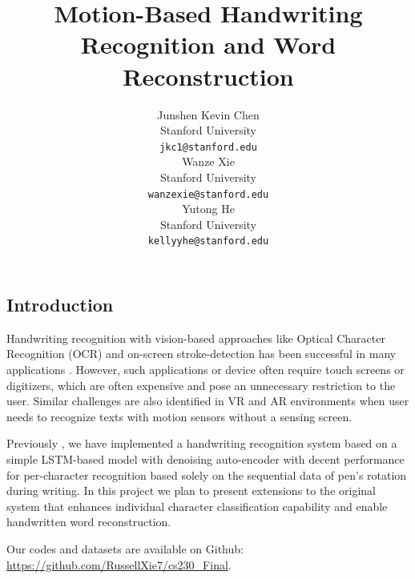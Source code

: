 \documentclass{article}
\title{Motion-Based Handwriting Recognition and Word Reconstruction }
\author{
  Junshen Kevin Chen \\
  Stanford University\\
  \texttt{jkc1@stanford.edu} \\
   \And
  Wanze Xie \\
  Stanford University\\
  \texttt{wanzexie@stanford.edu} \\
    \And
  Yutong He \\
  Stanford University\\
  \texttt{kellyyhe@stanford.edu} \\
}
\begin{document}
\maketitle



\begin{multicols*}{2}

\vspace{-15px}
\section{Introduction}

Handwriting recognition with vision-based approaches like Optical Character Recognition (OCR) and on-screen stroke-detection has been successful in many applications \cite{bib1, bib2, bib3}. However, such applications or device often require touch screens or digitizers, which are often expensive and pose an unnecessary restriction to the user. Similar challenges are also identified in VR and AR environments \cite{bib4} when user needs to recognize texts with motion sensors without a sensing screen. 

Previously \cite{ours}, we have implemented a handwriting recognition system based on a simple LSTM-based model \cite{lstm} with denoising auto-encoder with decent performance for per-character recognition based solely on the sequential data of pen's rotation during writing. In this project we plan to present extensions to the original system that enhances individual character classification capability and enable handwritten word reconstruction.

Our codes and datasets are available on Github: \url{https://github.com/RussellXie7/cs230\_Final}.



\end{multicols*}
\end{document}
